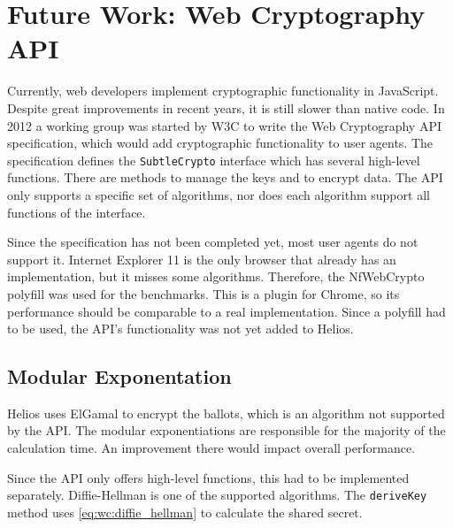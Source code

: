 % 
%

\section{Future Work: Web Cryptography API}
\label{sec:web_cryptography_api}

Currently, web developers implement cryptographic functionality in JavaScript. Despite great improvements in recent years, it is still slower than native code.\cite{site:resig_javascript_performance_rundown}\cite{site:cois_javascript_performance_rundown_2012}\cite{smedberg_performance_analysis_of_javascript} In 2012 a working group was started by W3C to write the Web Cryptography API specification, which would add cryptographic functionality to user agents.\cite{wiki:webcrypto} The specification defines the \texttt{SubtleCrypto} interface which has several high-level functions.\cite{sleevi_watson_web_cryptography_api} There are methods to manage the keys and to encrypt data. The API only supports a specific set of algorithms, nor does each algorithm support all functions of the interface.

\par Since the specification has not been completed yet, most user agents do not support it. Internet Explorer 11 is the only browser that already has an implementation, but it misses some algorithms.\cite{site:microsoft_web_cryptography} Therefore, the NfWebCrypto polyfill was used for the benchmarks. This is a \cplusplus plugin for Chrome, so its performance should be comparable to a real implementation. Since a polyfill had to be used, the API's functionality was not yet added to Helios.

\subsection{Modular Exponentation}
\label{sec:wc:modular_exponentiation}

Helios uses ElGamal to encrypt the ballots, which is an algorithm not supported by the API. The modular exponentiations are responsible for the majority of the calculation time. An improvement there would impact overall performance.

\par Since the API only offers high-level functions, this had to be implemented separately. Diffie-Hellman is one of the supported algorithms. The \texttt{deriveKey} method uses \ref{eq:wc:diffie_hellman} to calculate the shared secret.\cite{diffie_hellman_new_directions_in_cryptography}

